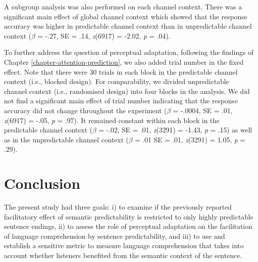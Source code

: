 \documentclass[a4paper, nobind]{templates/ociamthesis}
\begin{document}
A subgroup analysis was also performed on each channel context.
There was a significant main effect of global channel context which showed that the response accuracy was higher in predictable channel context than in unpredictable channel context (\(\beta\) = -.27, SE = .14, \emph{z}(6917) = -2.02, \emph{p} = .04).

To further address the question of perceptual adaptation, following the findings of Chapter \ref{chapter-attention-prediction}, we also added trial number in the fixed effect.
Note that there were 30 trials in each block in the predictable channel context (i.e., blocked design).
For comparability, we divided unpredictable channel context (i.e., randomised design) into four blocks in the analysis.
We did not find a significant main effect of trial number indicating that the response accuracy did not change throughout the experiment (\(\beta\) = -.0004, SE = .01, \emph{z}(6917) = -.05, \emph{p} = .97).
It remained constant within each block in the predictable channel context (\(\beta\) = -.02, SE = .01, \emph{z}(3291) = -1.43, \emph{p} = .15) as well as in the unpredictable channel context (\(\beta\) = .01 SE = .01, \emph{z}(3291) = 1.05, \emph{p} = .29).

\hypertarget{conclusion-1}{%
\section{Conclusion}\label{conclusion-1}}

The present study had three goals: i) to examine if the previously reported facilitatory effect of semantic predictability is restricted to only highly predictable sentence endings,
ii) to assess the role of perceptual adaptation on the facilitation of language comprehension by sentence predictability, and
iii) to use and establish a sensitive metric to measure language comprehension that takes into account whether listeners benefited from the semantic context of the sentence.
\end{document}
